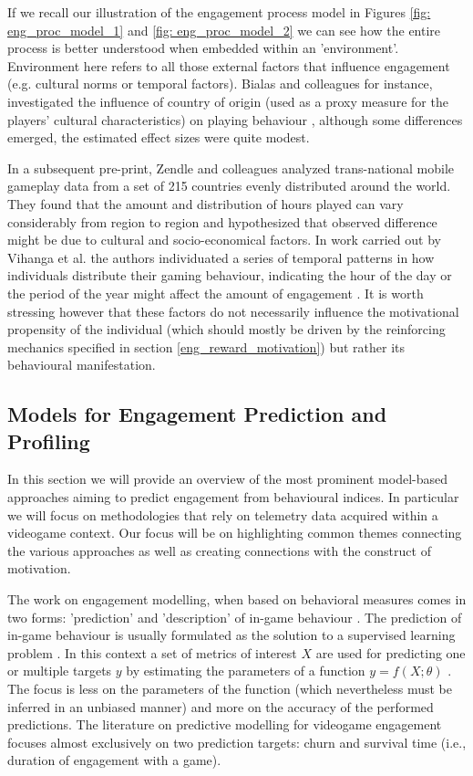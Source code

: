If we recall our illustration of the engagement process model in Figures \ref{fig: eng_proc_model_1} and \ref{fig: eng_proc_model_2} we can see how the entire process is better understood when embedded within an 'environment'. Environment here refers to all those external factors that influence engagement  (e.g. cultural norms or temporal factors). Bialas and colleagues for instance, investigated the influence of country of origin (used as a proxy measure for the players’ cultural characteristics) on playing behaviour \cite{bialas2014cultural}, although some differences emerged, the estimated effect sizes were quite modest.

In a subsequent pre-print, Zendle and colleagues \cite{zendle2022transnational} analyzed trans-national mobile gameplay data from a set of 215 countries evenly distributed around the world. They found that the amount and distribution of hours played can vary considerably from region to region and hypothesized that observed difference might be due to cultural and socio-economical factors. In work carried out by Vihanga et al. the authors individuated a series of temporal patterns in how individuals distribute their gaming behaviour, indicating the hour of the day or the period of the year might affect the amount of engagement \cite{vihanga2019weekly}. It is worth stressing however that these factors do not necessarily influence the motivational propensity of the individual (which should mostly be driven by the reinforcing mechanics specified in section \ref{eng_reward_motivation}) but rather its behavioural manifestation.

\subsection{Models for Engagement Prediction and Profiling}
\label{engagement_prediction}
In this section we will provide an overview of the most prominent model-based approaches aiming to predict engagement from behavioural indices. In particular we will focus on methodologies that rely on telemetry data acquired within a videogame context. Our focus will be on highlighting common themes connecting the various approaches as well as creating connections with the construct of motivation. 

The work on engagement modelling, when based on behavioral measures comes in two forms: 'prediction' and 'description' of in-game behaviour \cite{el2016game}. The prediction of in-game behaviour is usually formulated as the solution to a supervised learning problem \cite{el2016game}. In this context a set of metrics of interest $X$ are used for predicting one or multiple targets $y$ by estimating the parameters of a function $y = f(X; \theta)$ \cite{bishop2006pattern}. The focus is less on the parameters of the function (which nevertheless must be inferred in an unbiased manner) and more on the accuracy of the performed predictions. The literature on predictive modelling for videogame engagement focuses almost exclusively  on two prediction targets: churn and survival time (i.e., duration of engagement with a game). 


